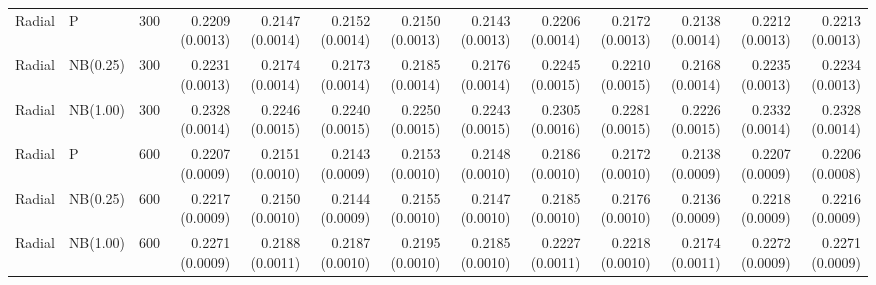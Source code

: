 \begin{table}[p]
{\begin{tabular}{lllrrrrrrrrrr}
\hline
Radial & P & 300 & 0.2209 (0.0013) & 0.2147 (0.0014) & 0.2152 (0.0014) & 0.2150 (0.0013) & 0.2143 (0.0013) & 0.2206 (0.0014) & 0.2172 (0.0013) & 0.2138 (0.0014) & 0.2212 (0.0013) & 0.2213 (0.0013) \\
Radial & NB(0.25) & 300 & 0.2231 (0.0013) & 0.2174 (0.0014) & 0.2173 (0.0014) & 0.2185 (0.0014) & 0.2176 (0.0014) & 0.2245 (0.0015) & 0.2210 (0.0015) & 0.2168 (0.0014) & 0.2235 (0.0013) & 0.2234 (0.0013) \\
Radial & NB(1.00) & 300 & 0.2328 (0.0014) & 0.2246 (0.0015) & 0.2240 (0.0015) & 0.2250 (0.0015) & 0.2243 (0.0015) & 0.2305 (0.0016) & 0.2281 (0.0015) & 0.2226 (0.0015) & 0.2332 (0.0014) & 0.2328 (0.0014) \\
Radial & P & 600 & 0.2207 (0.0009) & 0.2151 (0.0010) & 0.2143 (0.0009) & 0.2153 (0.0010) & 0.2148 (0.0010) & 0.2186 (0.0010) & 0.2172 (0.0010) & 0.2138 (0.0009) & 0.2207 (0.0009) & 0.2206 (0.0008) \\
Radial & NB(0.25) & 600 & 0.2217 (0.0009) & 0.2150 (0.0010) & 0.2144 (0.0009) & 0.2155 (0.0010) & 0.2147 (0.0010) & 0.2185 (0.0010) & 0.2176 (0.0010) & 0.2136 (0.0009) & 0.2218 (0.0009) & 0.2216 (0.0009) \\
Radial & NB(1.00) & 600 & 0.2271 (0.0009) & 0.2188 (0.0011) & 0.2187 (0.0010) & 0.2195 (0.0010) & 0.2185 (0.0010) & 0.2227 (0.0011) & 0.2218 (0.0010) & 0.2174 (0.0011) & 0.2272 (0.0009) & 0.2271 (0.0009) \\
\hline
\end{tabular}%
}
\end{table}



